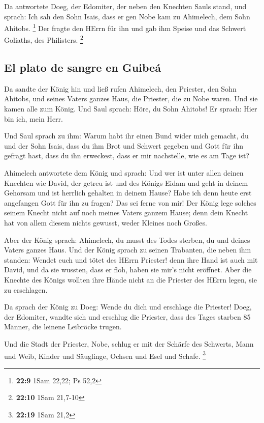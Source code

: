  Da antwortete Doeg, der Edomiter, der neben den Knechten
Sauls stand, und sprach: Ich sah den Sohn Isais, dass er gen Nobe kam zu
Ahimelech, dem Sohn Ahitobs. \footnote{\textbf{22:9} 1Sam 22,22; Ps 52,2}
 Der fragte den HErrn für ihn und gab ihm Speise und das
Schwert Goliaths, des Philisters. \footnote{\textbf{22:10} 1Sam 21,7-10}

\hypertarget{el-plato-de-sangre-en-guibeuxe1}{%
\subsection{El plato de sangre en
Guibeá}\label{el-plato-de-sangre-en-guibeuxe1}}

 Da sandte der König hin und ließ rufen Ahimelech, den
Priester, den Sohn Ahitobs, und seines Vaters ganzes Haus, die Priester,
die zu Nobe waren. Und sie kamen alle zum König.  Und
Saul sprach: Höre, du Sohn Ahitobs! Er sprach: Hier bin ich, mein Herr.

 Und Saul sprach zu ihm: Warum habt ihr einen Bund wider
mich gemacht, du und der Sohn Isais, dass du ihm Brot und Schwert
gegeben und Gott für ihn gefragt hast, dass du ihn erweckest, dass er
mir nachstelle, wie es am Tage ist?

 Ahimelech antwortete dem König und sprach: Und wer ist
unter allen deinen Knechten wie David, der getreu ist und des Königs
Eidam und geht in deinem Gehorsam und ist herrlich gehalten in deinem
Hause?  Habe ich denn heute erst angefangen Gott für ihn
zu fragen? Das sei ferne von mir! Der König lege solches seinem Knecht
nicht auf noch meines Vaters ganzem Hause; denn dein Knecht hat von
allem diesem nichts gewusst, weder Kleines noch Großes.

 Aber der König sprach: Ahimelech, du musst des Todes
sterben, du und deines Vaters ganzes Haus.  Und der König
sprach zu seinen Trabanten, die neben ihm standen: Wendet euch und tötet
des HErrn Priester! denn ihre Hand ist auch mit David, und da sie
wussten, dass er floh, haben sie mir's nicht eröffnet. Aber die Knechte
des Königs wollten ihre Hände nicht an die Priester des HErrn legen, sie
zu erschlagen.

 Da sprach der König zu Doeg: Wende du dich und erschlage
die Priester! Doeg, der Edomiter, wandte sich und erschlug die Priester,
dass des Tages starben 85 Männer, die leinene Leibröcke trugen.

 Und die Stadt der Priester, Nobe, schlug er mit der
Schärfe des Schwerts, Mann und Weib, Kinder und Säuglinge, Ochsen und
Esel und Schafe. \footnote{\textbf{22:19} 1Sam 21,2}

